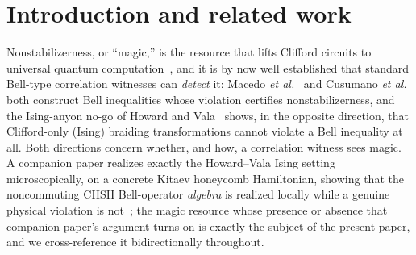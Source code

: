 \documentclass[aps,pra,twocolumn,superscriptaddress,longbibliography,floatfix,nofootinbib]{revtex4-2}
\begin{document}

\maketitle

\section{Introduction and related work}
\label{sec:intro}

Nonstabilizerness, or ``magic,'' is the resource that lifts Clifford
circuits to universal quantum computation~\cite{VeitchEtAl2014,%
HowardCampbell2017}, and it is by now well established that standard
Bell-type correlation witnesses can \emph{detect} it: Macedo \emph{et
al.}~\cite{Macedo2025} and Cusumano \emph{et
al.}~\cite{Cusumano2026} both construct Bell inequalities whose
violation certifies nonstabilizerness, and the Ising-anyon no-go of
Howard and Vala~\cite{HowardVala2012} shows, in the opposite direction,
that Clifford-only (Ising) braiding transformations cannot violate a
Bell inequality at all. Both directions concern whether, and how, a
correlation witness sees magic. A companion paper realizes exactly
the Howard--Vala Ising setting microscopically, on a concrete Kitaev
honeycomb Hamiltonian, showing that the noncommuting CHSH
Bell-operator \emph{algebra} is realized locally while a genuine
physical violation is not~\cite{Sayim2026witness}; the magic resource
whose presence or absence that companion paper's argument turns on is
exactly the subject of the present paper, and we cross-reference it
bidirectionally throughout.
\end{document}
